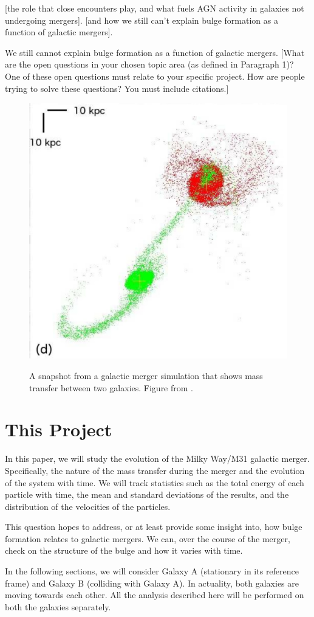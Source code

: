 \documentclass[linenumbers]{aastex631} %
\begin{document}
\citep{Silverman_2011} [the role that close encounters play, and what fuels AGN activity in galaxies not undergoing mergers]. [and how we still can't explain bulge formation as a function of galactic mergers]\citep{Brooks2016}.

We still cannot explain bulge formation as a function of galactic mergers. 
[What are the open questions in your chosen topic area (as defined in
Paragraph 1)? One of these open questions must relate to your specific project. How
are people trying to solve these questions? You must include citations.]

\begin{figure}
    \centering
    \includegraphics[width = 0.5\linewidth]{page08_1.jpg}
    \label{fig:Privon image}
    \caption{A snapshot from a galactic merger simulation that shows mass transfer between two galaxies. Figure from \citep{Privon_2013}.}
\end{figure}


\section{This Project}

In this paper, we will study the evolution of the Milky Way/M31 galactic merger. Specifically, the nature of the mass transfer during the merger and the evolution of the system with time. We will track statistics such as the total energy of each particle with time, the mean and standard deviations of the results, and the distribution of the velocities of the particles.

This question hopes to address, or at least provide some insight into, how bulge formation relates to galactic mergers. We can, over the course of the merger, check on the structure of the bulge and how it varies with time. 



In the following sections, we will consider Galaxy A (stationary in its reference frame) and Galaxy B (colliding with Galaxy A). In actuality, both galaxies are moving towards each other. All the analysis described here will be performed on both the galaxies separately.
\end{document}
